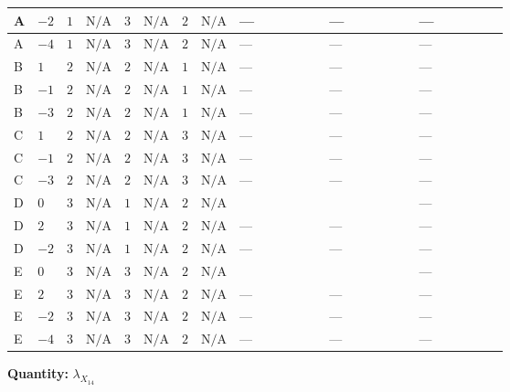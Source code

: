 \documentclass[8pt]{article}
\begin{document}
\begin{landscape}
\begin{longtable}{@{}llcccccc >{\raggedright\arraybackslash}p{0.21\linewidth} >{\raggedright\arraybackslash}p{0.21\linewidth} >{\raggedright\arraybackslash}p{0.21\linewidth}@{}}
\midrule
A & $-2$ & $1$ & $\text{N/A}$ & $3$ & $\text{N/A}$ & $2$ & $\text{N/A}$ & --- & --- & --- \\
\midrule
A & $-4$ & $1$ & $\text{N/A}$ & $3$ & $\text{N/A}$ & $2$ & $\text{N/A}$ & --- & --- & --- \\
\midrule
B & $1$ & $2$ & $\text{N/A}$ & $2$ & $\text{N/A}$ & $1$ & $\text{N/A}$ & --- & --- & --- \\
\midrule
B & $-1$ & $2$ & $\text{N/A}$ & $2$ & $\text{N/A}$ & $1$ & $\text{N/A}$ & --- & --- & --- \\
\midrule
B & $-3$ & $2$ & $\text{N/A}$ & $2$ & $\text{N/A}$ & $1$ & $\text{N/A}$ & --- & --- & --- \\
\midrule
C & $1$ & $2$ & $\text{N/A}$ & $2$ & $\text{N/A}$ & $3$ & $\text{N/A}$ & --- & --- & --- \\
\midrule
C & $-1$ & $2$ & $\text{N/A}$ & $2$ & $\text{N/A}$ & $3$ & $\text{N/A}$ & --- & --- & --- \\
\midrule
C & $-3$ & $2$ & $\text{N/A}$ & $2$ & $\text{N/A}$ & $3$ & $\text{N/A}$ & --- & --- & --- \\
\midrule
D & $0$ & $3$ & $\text{N/A}$ & $1$ & $\text{N/A}$ & $2$ & $\text{N/A}$ & \scriptsize\adjustbox{max width=\linewidth}{$\begin{gathered} +4 {\lambda_{HS_1}^{(1)}} {\lambda_{X_{14}}}\end{gathered}$} & \scriptsize\adjustbox{max width=\linewidth}{$\begin{gathered} +4 {\lambda_{HS_2}^{(1)}} {\lambda_{X_{14}}}\end{gathered}$} & --- \\
\midrule
D & $2$ & $3$ & $\text{N/A}$ & $1$ & $\text{N/A}$ & $2$ & $\text{N/A}$ & --- & --- & --- \\
\midrule
D & $-2$ & $3$ & $\text{N/A}$ & $1$ & $\text{N/A}$ & $2$ & $\text{N/A}$ & --- & --- & --- \\
\midrule
E & $0$ & $3$ & $\text{N/A}$ & $3$ & $\text{N/A}$ & $2$ & $\text{N/A}$ & \scriptsize\adjustbox{max width=\linewidth}{$\begin{gathered} +4 {\lambda_{HS_1}^{(1)}} {\lambda_{X_{14}}}\end{gathered}$} & \scriptsize\adjustbox{max width=\linewidth}{$\begin{gathered} +4 {\lambda_{HS_2}^{(1)}} {\lambda_{X_{14}}}\end{gathered}$} & --- \\
\midrule
E & $2$ & $3$ & $\text{N/A}$ & $3$ & $\text{N/A}$ & $2$ & $\text{N/A}$ & --- & --- & --- \\
\midrule
E & $-2$ & $3$ & $\text{N/A}$ & $3$ & $\text{N/A}$ & $2$ & $\text{N/A}$ & --- & --- & --- \\
\midrule
E & $-4$ & $3$ & $\text{N/A}$ & $3$ & $\text{N/A}$ & $2$ & $\text{N/A}$ & --- & --- & --- \\
\midrule
\bottomrule
\end{longtable}
\clearpage
\noindent\textbf{Quantity: }${\lambda_{X_{14}}}$\par\smallskip

\end{landscape}
\end{document}
